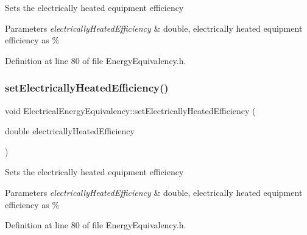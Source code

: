 Sets the electrically heated equipment efficiency


\begin{DoxyParams}{Parameters}
{\em electrically\+Heated\+Efficiency} & double, electrically heated equipment efficiency as \% \\
\hline
\end{DoxyParams}


Definition at line 80 of file Energy\+Equivalency.\+h.

\mbox{\label{class_electrical_energy_equivalency_ab9091e720096a4c088cece14e975ccb4}} 
\subsubsection{\texorpdfstring{set\+Electrically\+Heated\+Efficiency()}{setElectricallyHeatedEfficiency()}\hspace{0.1cm}{\footnotesize\ttfamily [2/3]}}
{\footnotesize\ttfamily void Electrical\+Energy\+Equivalency\+::set\+Electrically\+Heated\+Efficiency (\begin{DoxyParamCaption}\item[{double}]{electrically\+Heated\+Efficiency }\end{DoxyParamCaption})\hspace{0.3cm}{\ttfamily [inline]}}

Sets the electrically heated equipment efficiency


\begin{DoxyParams}{Parameters}
{\em electrically\+Heated\+Efficiency} & double, electrically heated equipment efficiency as \% \\
\hline
\end{DoxyParams}


Definition at line 80 of file Energy\+Equivalency.\+h.

\mbox{\label{class_electrical_energy_equivalency_ab9091e720096a4c088cece14e975ccb4}} 
